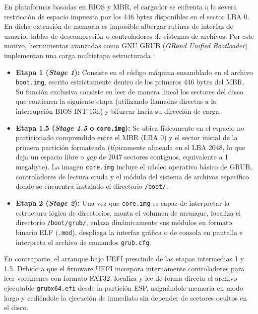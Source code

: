 \documentclass[12pt]{article}
\begin{document}
En plataformas basadas en BIOS y MBR, el cargador se enfrenta a la severa restricción de espacio impuesta por los 446 bytes disponibles en el sector LBA 0. En dicha extensión de memoria es imposible albergar rutinas de interfaz de usuario, tablas de descompresión o controladores de sistemas de archivos. Por este motivo, herramientas avanzadas como GNU GRUB (\textit{GRand Unified Bootloader}) implementan una carga multietapa estructurada \parencite{gnugrub2024manual}:
\begin{itemize}[noitemsep, topsep=2pt]
    \item \textbf{Etapa 1 (\textit{Stage 1}):} Consiste en el código máquina ensamblado en el archivo \texttt{boot.img}, escrito estrictamente dentro de los primeros 446 bytes del MBR. Su función exclusiva consiste en leer de manera lineal los sectores del disco que contienen la siguiente etapa (utilizando llamadas directas a la interrupción BIOS INT 13h) y bifurcar hacia su dirección de carga.
    \item \textbf{Etapa 1.5 (\textit{Stage 1.5} o \texttt{core.img}):} Se ubica físicamente en el espacio no particionado comprendido entre el MBR (LBA 0) y el sector inicial de la primera partición formateada (típicamente alineada en el LBA 2048, lo que deja un espacio libre o \textit{gap} de 2047 sectores contiguos, equivalente a 1 megabyte). La imagen \texttt{core.img} incluye el núcleo operativo básico de GRUB, controladores de lectura cruda y el módulo del sistema de archivos específico donde se encuentra instalado el directorio \texttt{/boot/}.
    \item \textbf{Etapa 2 (\textit{Stage 2}):} Una vez que \texttt{core.img} es capaz de interpretar la estructura lógica de directorios, monta el volumen de arranque, localiza el directorio \texttt{/boot/grub/}, enlaza dinámicamente sus módulos en formato binario ELF (\texttt{.mod}), despliega la interfaz gráfica o de consola en pantalla e interpreta el archivo de comandos \texttt{grub.cfg}.
\end{itemize}

En contraparte, el arranque bajo UEFI prescinde de las etapas intermedias 1 y 1.5. Debido a que el firmware UEFI incorpora internamente controladores para leer volúmenes con formato FAT32, localiza y lee de forma directa el archivo ejecutable \texttt{grubx64.efi} desde la partición ESP, asignándole memoria en modo largo y cediéndole la ejecución de inmediato sin depender de sectores ocultos en el disco.
\end{document}
